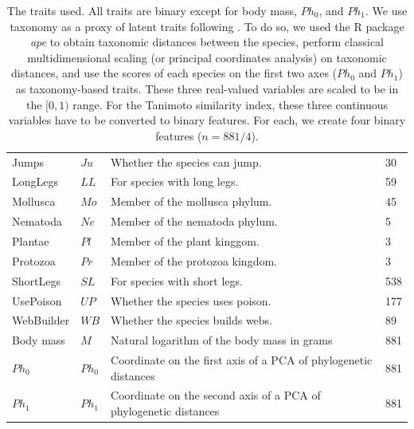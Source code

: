 \documentclass[letterpaper]{article}
\begin{document}
\begin{table}
\begin{tabular}{|llll|}
    Jumps             & $Ju$   & Whether the species can jump.                                    & 30 \\
    LongLegs          & $LL$   & For species with long legs.                                      & 59 \\
    Mollusca          & $Mo$   & Member of the mollusca phylum.                                   & 45 \\
    Nematoda          & $Ne$   & Member of the nematoda phylum.                                   & 5 \\
    Plantae           & $Pl$   & Member of the plant kinggom.                                     & 3 \\
    Protozoa          & $Pr$   & Member of the protozoa kingdom.                                  & 3 \\
    ShortLegs         & $SL$   & For species with short legs.                                     & 538 \\
    UsePoison         & $UP$   & Whether the species uses poison.                                 & 177 \\
    WebBuilder        & $WB$   & Whether the species builds webs.                                 & 89 \\
    Body mass         & $M$    & Natural logarithm of the body mass in grams                      & 881 \\
    $Ph_0$            & $Ph_0$ & Coordinate on the first axis of a PCA of phylogenetic distances  & 881 \\
    $Ph_1$            & $Ph_1$ & Coordinate on the second axis of a PCA of phylogenetic distances & 881 \\
    \hline
  \end{tabular}

  \caption{The traits used. All traits are binary except for body mass, $Ph_0$,
  and $Ph_1$. We use taxonomy as a proxy of latent traits following
  \cite{mou12}. To do so, we used the R package \emph{ape} to obtain taxonomic
  distances between the species, perform classical multidimensional scaling (or
  principal coordinates analysis) \cite{cox01} on taxonomic distances, and use
  the scores of each species on the first two axes ($Ph_0$ and $Ph_1$) as
  taxonomy-based traits. These three real-valued variables are scaled to be in
  the $[0, 1)$ range. For the Tanimoto similarity index, these three continuous
  variables have to be converted to binary features. For each, we create four
  binary features ($n = 881/4$).}

  \label{table:features}
\end{table}
\end{document}
